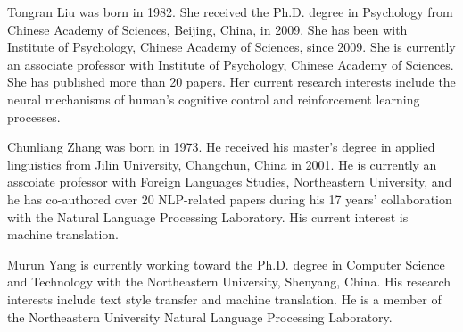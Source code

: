 \vspace{-10mm}
\begin{IEEEbiography}
{Tongran Liu}
was born in 1982. She received the Ph.D. degree in Psychology from Chinese Academy of Sciences, Beijing, China, in 2009. She has been with Institute of Psychology, Chinese Academy of Sciences, since 2009. She is currently an associate professor with Institute of Psychology, Chinese Academy of Sciences. She has published more than 20 papers. Her current research interests include the neural mechanisms of human's cognitive control and reinforcement learning processes.
\end{IEEEbiography}
\vspace{-10mm}
\begin{IEEEbiography}
{Chunliang Zhang}
was born in 1973. He received his master’s degree in applied linguistics from Jilin University, Changchun, China in 2001. He is currently an asscoiate professor with Foreign Languages Studies, Northeastern University, and he has co-authored over 20 NLP-related papers during his 17 years’ collaboration with the Natural Language Processing Laboratory. His current interest is machine translation.
\end{IEEEbiography}
\vspace{-10mm}
\begin{IEEEbiography}
{Murun Yang}
is currently working toward the Ph.D. degree in Computer Science and Technology with the Northeastern University, Shenyang, China. His research interests include text style transfer and machine translation. He is a member of the Northeastern University Natural Language Processing Laboratory.
\end{IEEEbiography}
